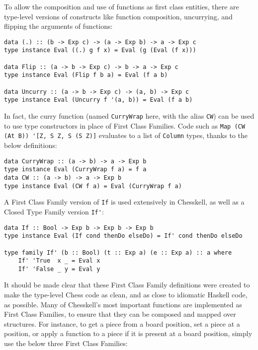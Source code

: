 \documentclass[12pt, a4paper, bibliography=totocnumbered]{scrreprt}
\newcommand{\inline}[1]{\lstinline[basicstyle=\ttfamily\footnotesize]{#1}}
\begin{document}
To allow the composition and use of functions as first class entities, there are type-level versions of constructs like function composition, uncurrying, and flipping the arguments of functions:

\begin{lstlisting}
data (.) :: (b -> Exp c) -> (a -> Exp b) -> a -> Exp c
type instance Eval ((.) g f x) = Eval (g (Eval (f x)))

data Flip :: (a -> b -> Exp c) -> b -> a -> Exp c
type instance Eval (Flip f b a) = Eval (f a b)

data Uncurry :: (a -> b -> Exp c) -> (a, b) -> Exp c
type instance Eval (Uncurry f '(a, b)) = Eval (f a b)
\end{lstlisting}

In fact, the curry function (named \inline{CurryWrap} here, with the alias \inline{CW}) can be used to use type constructors in place of First Class Families. Code such as \inline{Map (CW (At B)) '[Z, S Z, S (S Z)]} evaluates to a list of \inline{Column} types, thanks to the below definitions:

\begin{lstlisting}
data CurryWrap :: (a -> b) -> a -> Exp b
type instance Eval (CurryWrap f a) = f a
data CW :: (a -> b) -> a -> Exp b
type instance Eval (CW f a) = Eval (CurryWrap f a)
\end{lstlisting}

A First Class Family version of \inline{If} is used extensively in Chesskell, as well as a Closed Type Family version \inline{If'}:

\begin{lstlisting}
data If :: Bool -> Exp b -> Exp b -> Exp b
type instance Eval (If cond thenDo elseDo) = If' cond thenDo elseDo

type family If' (b :: Bool) (t :: Exp a) (e :: Exp a) :: a where
    If' 'True  x _ = Eval x
    If' 'False _ y = Eval y
\end{lstlisting}

It should be made clear that these First Class Family definitions were created to make the type-level Chess code as clean, and as close to idiomatic Haskell code, as possible. Many of Chesskell's most important functions are implemented as First Class Families, to ensure that they can be composed and mapped over structures. For instance, to get a piece from a board position, set a piece at a position, or apply a function to a piece if it is present at a board position, simply use the below three First Class Families:
\end{document}
